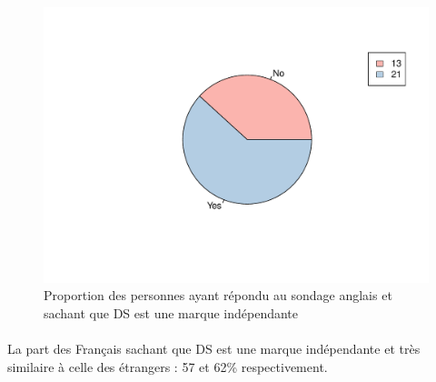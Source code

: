\documentclass[12pt]{article}\usepackage[]{graphicx}\usepackage[]{color}
\makeatletter
\def\maxwidth{ %
  \ifdim\Gin@nat@width>\linewidth
    \linewidth
  \else
    \Gin@nat@width
  \fi
}
\newenvironment{knitrout}{}{} %
\makeatother
\begin{document}
\begin{knitrout}
\color{fgcolor}\begin{figure}[H]
\includegraphics[width=\maxwidth]{figure/ds_know_en-1} \caption[Proportion des personnes ayant répondu au sondage anglais sachant que DS est une marque indépendante]{Proportion des personnes ayant répondu au sondage anglais et sachant que DS est une marque indépendante}\label{fig:ds know en}
\end{figure}


\end{knitrout}

\paragraph{} La part des Français sachant que DS est une marque indépendante et
très similaire à celle des étrangers : 57 et 62\% respectivement.
\end{document}
